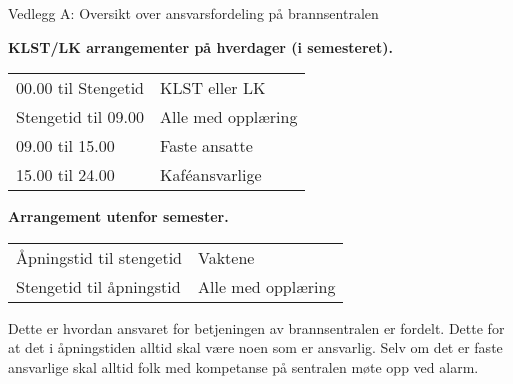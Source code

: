 \begin{instruks}{Vedlegg A: Oversikt over ansvarsfordeling på brannsentralen}{}{}
    
    \textbf{KLST/LK arrangementer på hverdager (i semesteret).}
    
    \begin{tabular}{ll}
        00.00 til Stengetid &   KLST eller LK \\
        Stengetid til 09.00 &   Alle med opplæring \\
        09.00 til 15.00 &     Faste ansatte \\
        15.00 til 24.00 &      Kaf\'eansvarlige 
    \end{tabular}

    
    \textbf{Arrangement utenfor semester.}
    
    \begin{tabular}{ll}
        Åpningstid til stengetid &     Vaktene \\
        Stengetid til åpningstid &     Alle med opplæring
    \end{tabular}
    
    
    \vspace{10mm}
    Dette er hvordan ansvaret for betjeningen av brannsentralen er fordelt. Dette for at det i
    åpningstiden alltid skal være
    noen som er ansvarlig. Selv om det er faste ansvarlige skal alltid folk med kompetanse på
    sentralen møte opp ved alarm.
\end{instruks}




